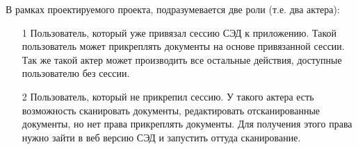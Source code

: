 В рамках проектируемого проекта, подразумевается две роли (т.е. два актера):
\begin{enumerate}
	\item[1] Пользователь, который уже привязал сессию СЭД к приложению. Такой пользователь может прикреплять документы на основе привязанной сессии. Так же такой актер может производить все остальные действия, доступные пользователю без сессии.
	\item[2] Пользователь, который не прикрепил сессию. У такого актера есть возможность сканировать документы, редактировать отсканированные документы, но нет права прикреплять документы. Для получения этого права нужно зайти в веб версию СЭД и запустить оттуда сканирование.
\end{enumerate}
